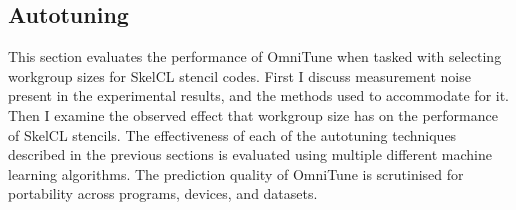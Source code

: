 \documentclass[nonatbib,preprint,10pt]{sigplanconf}
\begin{document}



\subsection{Autotuning}

This section evaluates the performance of OmniTune when tasked with
selecting workgroup sizes for SkelCL stencil codes. First I discuss
measurement noise present in the experimental results, and the methods
used to accommodate for it. Then I examine the observed effect that
workgroup size has on the performance of SkelCL stencils. The
effectiveness of each of the autotuning techniques described in the
previous sections is evaluated using multiple different machine
learning algorithms. The prediction quality of OmniTune is scrutinised
for portability across programs, devices, and datasets.
\end{document}
